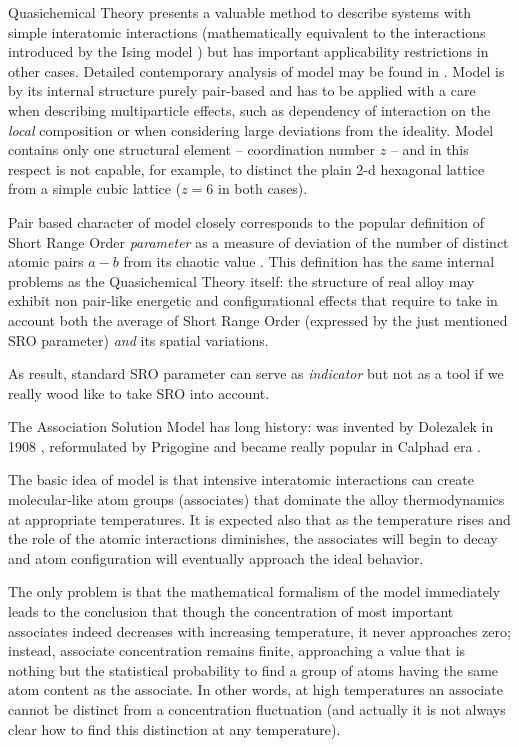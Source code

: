 \documentclass[12pt,abstract]{scrartcl}
\begin{document}
Quasichemical Theory \cite{GUGGENHEIM1952}  presents a valuable method to describe systems with simple interatomic interactions (mathematically equivalent  to the interactions introduced by the Ising model \cite{Hill1956}) but has important applicability restrictions in other cases. Detailed contemporary  analysis of model may be found in \cite{Hillert2008}. 
Model is by its internal structure purely pair-based and  has to be applied with a care when describing  multiparticle effects, such as dependency of interaction on the \textit{local} composition or when considering large deviations from the ideality. Model contains only one structural element -- coordination number $z$ -- and in this respect is not capable, for example, to distinct the plain 2-d hexagonal lattice from a simple cubic lattice ($z = 6$ in both cases).

Pair based character of model closely corresponds to the popular definition of Short Range Order \textit{parameter} as a measure of deviation of the number of distinct atomic pairs $a-b$ from its chaotic value \cite{hanslukas2007,Hillert2008,Pelton2007}. This definition has the same internal problems as the Quasichemical Theory itself: the structure of real alloy may exhibit non pair-like energetic and configurational effects that require to take in account both the average of  Short Range  Order (expressed by the just mentioned SRO parameter) \textit{and}  its spatial variations.  

As result, standard SRO parameter can serve as \textit{indicator} but not as a tool if we really wood like to take SRO into account.


The Association Solution Model has long history: was invented by Dolezalek in 1908 \cite{Dolezalek1908}, reformulated by Prigogine \cite{Prigogine1954} and became really popular in Calphad era \cite{Schmid1985}.



The basic idea of model is that intensive interatomic interactions can create molecular-like atom groups (associates) that dominate the alloy thermodynamics at appropriate temperatures. 
It is expected also that as the temperature rises and  the role of the atomic interactions diminishes, the associates will begin to
decay and atom configuration will eventually approach the ideal behavior.

The only problem is that the mathematical formalism of the model immediately leads to the conclusion \cite{TISR_p3} that though the concentration of most important associates indeed decreases with increasing temperature, it never approaches zero;
instead,  associate concentration remains finite, approaching  a  value that is nothing but the statistical probability to find a group of atoms having the same atom content as the associate. In other words, at high temperatures an associate cannot be distinct from a concentration fluctuation (and actually it is not always clear how to find this distinction at any temperature).
\end{document}
